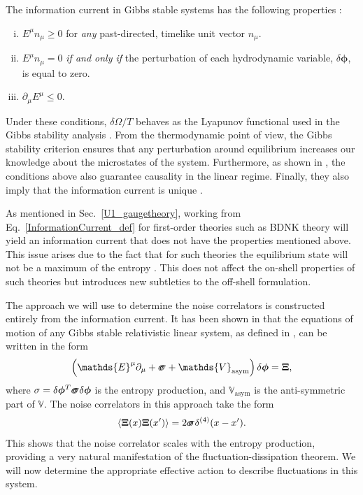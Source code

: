 \documentclass[aps,prd,nofootinbib,amsmath,amssymb,showpacs,longbibliography,singlecolumn,superscriptaddress,notitlepage]{revtex4-1}
\theoremstyle{plain}
\theoremstyle{definition}
\newcommand*{\Scale}[2][4]{\scalebox{#1}{$#2$}}%
\newcommand{\forceds}[1]{\Scale[1.1]{\ensuremath{\mathrlap{{{#1}}}\hspace{1.4pt}#1}}}
\newcommand{\cvec}[1]{\ensuremath{\bm {#1}}}
\newcommand{\cmat}[1]{\ensuremath{\mathds{{#1}}}}
\newcommand{\cmatgreek}[1]{\ensuremath{\forceds{{#1}}}}
\begin{document}
The information current in Gibbs stable systems has the following properties \cite{Gavassino:2021kjm}:
\begin{enumerate}[i.]
    \item $E^{\mu} n_{\mu} \geq 0$ 
    for \emph{any} past-directed, timelike unit vector $n_{\mu}$.
    \item $E^{\mu} n_{\mu} = 0$ \emph{if and only if} the perturbation of each hydrodynamic variable, $\delta \cvec{\phi}$, is equal to zero. 
    \item $\partial_{\mu} E^{\mu} \leq 0$.
\end{enumerate}
Under these conditions, $\delta \Omega/T$ behaves as the Lyapunov functional used in the Gibbs stability analysis \cite{Gavassino:2021cli}. From the thermodynamic point of view, the Gibbs stability criterion ensures that any perturbation around equilibrium increases our knowledge about the microstates of the system. Furthermore, as shown in \cite{Gavassino:2021kjm}, the conditions above also guarantee causality in the linear regime. Finally, they also imply that the information current is unique \cite{Gavassino:2021kjm}. 

As mentioned in Sec.\ \ref{U1_gaugetheory}, working from Eq.\ \eqref{InformationCurrent_def} for first-order theories such as BDNK theory will yield an information current that does not have the properties mentioned above. This issue arises due to the fact that for such theories the equilibrium state will not be a maximum of the entropy \cite{Gavassino:2020ubn}. This does not affect the on-shell properties of such theories but introduces new subtleties to the off-shell formulation.

The approach we will use to determine the noise correlators is constructed entirely from the information current. It has been shown in  \cite{Gavassino:2023odx} that the equations of motion of any Gibbs stable relativistic linear system, as defined in \cite{Gavassino:2021kjm}, can be written in the form 
\begin{equation} \label{EoM_entropy_prod}
    \left( \cmat{E}^{\mu} \partial_{\mu} + \cmatgreek{\sigma} + \cmat{V}_{\mathrm{asym}} \right) \delta \cvec{\phi} = \cvec{\Xi} ,
\end{equation}
where $\sigma = \delta \cvec{\phi}^T \cmatgreek{\sigma} \delta \cvec{\phi}$ is the entropy production, and $\cmat{V}_{\mathrm{asym}}$ is the anti-symmetric part of $\cmat{V}$. The noise correlators in this approach take the form 
\begin{eqnarray} \label{Entropy_prod_noise}
    \langle \cvec{\Xi}(x) \cvec{\Xi}(x') \rangle = 2\cmatgreek{\sigma} \delta^{(4)}(x-x') .
\end{eqnarray}
This shows that the noise correlator scales with the entropy production, providing a very natural manifestation of the fluctuation-dissipation theorem. We will now determine the appropriate effective action to describe fluctuations in this system. 
\end{document}
